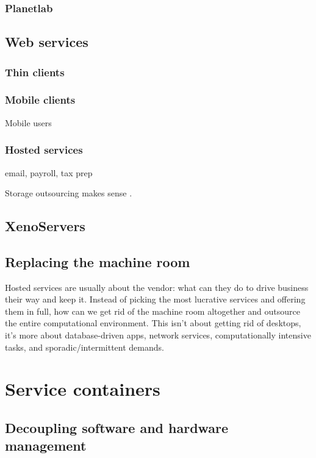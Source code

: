 \subsubsection{Planetlab}

\subsection{Web services}
\subsubsection{Thin clients}
\subsubsection{Mobile clients}

Mobile users \cite{demers}

\subsubsection{Hosted services}

email, payroll, tax prep

Storage outsourcing makes sense \cite{ng}.

\subsection{XenoServers}

\subsection{Replacing the machine room}

Hosted services are usually about the vendor: what can they do to drive business their way and keep it. Instead of picking the most lucrative services and offering them in full, how can we get rid of the machine room altogether and outsource the entire computational environment. This isn't about getting rid of desktops, it's more about database-driven apps, network services, computationally intensive tasks, and sporadic/intermittent demands.

\section{Service containers}

\subsection{Decoupling software and hardware management}

